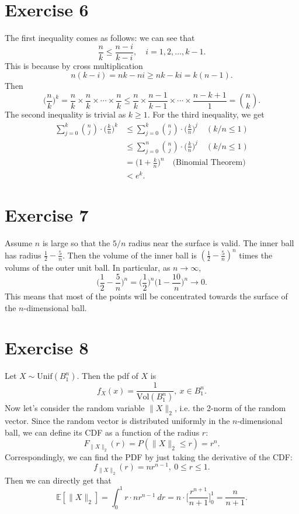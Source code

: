 \documentclass{article}
\begin{document}
\section*{Exercise 6}
The first inequality comes as follows: we can see that 
\[ \frac{n}{k} \leq \frac{n - i}{k - i}, \quad i = 1, 2, \dots, k - 1. \]
This is because by cross multiplication
\[ n(k - i) = nk - ni \geq nk - ki = k(n - 1). \]
Then
\[ \biggl( \frac{n}{k} \biggr)^k 
= \frac{n}{k} \times \frac{n}{k} \times \cdots \times \frac{n}{k} 
\leq \frac{n}{k} \times \frac{n - 1}{k - 1} \times \cdots \times \frac{n - k + 1}{1} 
= \binom{n}{k}. \]
The second inequality is trivial as $k \geq 1$.
For the third inequality, we get 
\begin{align*}
	\sum_{j = 0}^{k} \binom{n}{j} \cdot \biggl( \frac{k}{n} \biggr)^k 
	&\leq \sum_{j = 0}^{k} \binom{n}{j} \cdot \biggl( \frac{k}{n} \biggr)^j \quad (k/n \leq 1)\\
	&\leq \sum_{j = 0}^{n} \binom{n}{j} \cdot \biggl( \frac{k}{n} \biggr)^j \quad (k/n \leq 1)\\
	&= \biggl( 1 + \frac{k}{n} \biggr)^n \quad \text{(Binomial Theorem)} \\
	&< e^k.
\end{align*}


\newpage
\section*{Exercise 7}
Assume $n$ is large so that the $5/n$ radius near the surface is valid. The inner ball has radius 
$\frac{1}{2} - \frac{5}{n}$. Then the volume of the inner ball is $(\frac{1}{2} - \frac{5}{n})^n$ times 
the volums of the outer unit ball. In particular, as $n \to \infty$, 
\[ \biggl( \frac{1}{2} - \frac{5}{n} \biggr)^n 
= \biggl( \frac{1}{2} \biggr)^n \biggl( 1 - \frac{10}{n} \biggr)^n \to 0. \]
This means that most of the points will be concentrated towards the surface of the $n$-dimensional ball.


\newpage
\section*{Exercise 8}
Let $X \sim \text{Unif}(B_1^n)$. Then the pdf of $X$ is 
\[ f_X(x) = \frac{1}{\text{Vol}(B_1^n)}, \ x \in B_1^n. \]
Now let's consider the random variable $\|X\|_2$, i.e. the 2-norm of the random vector. Since 
the random vector is distributed uniformly in the $n$-dimensional ball, we can define its CDF as a 
function of the radius $r$: 
\[ F_{\|X\|_2}(r) = P(\|X\|_2 \leq r) = r^n. \]
Correspondingly, we can find the PDF by just taking the derivative of the CDF: 
\[ f_{\|X\|_2}(r) = nr^{n - 1}, \ 0 \leq r \leq 1. \]
Then we can directly get that 
\[ \mathbb{E}[\|X\|_2] = \int_{0}^{1} r \cdot nr^{n - 1} \ dr 
= n \cdot \biggl[ \frac{r^{n + 1}}{n + 1} \biggr]_0^1 = \frac{n}{n + 1}. \]
\end{document}

